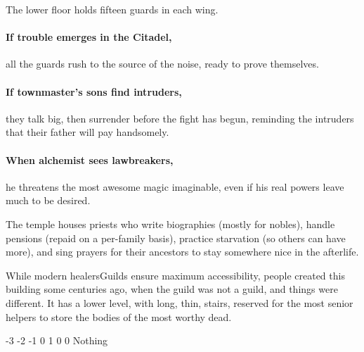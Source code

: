 \begin{multicols}{2}
The lower floor holds fifteen guards in each wing.


\paragraph{If trouble emerges in the Citadel,}
all the guards rush to the source of the noise, ready to prove themselves.


\paragraph{If \gls{townmaster}'s sons find intruders,}
they talk big, then surrender before the fight has begun, reminding the intruders that their father will pay handsomely.

\citadelAlchemist

\showStdSpells

\label{citadel_alchemist}

\paragraph{When \gls{alchemist} sees lawbreakers,}
he threatens the most awesome magic imaginable, even if his real powers leave much to be desired.

\townmaster


The temple houses priests who write biographies (mostly for nobles), handle pensions (repaid on a per-family basis), practice starvation (so others can have more), and sing prayers for their ancestors to stay somewhere nice in the afterlife.

While modern \glspl{healersGuild} ensure maximum accessibility, people created this building some centuries ago, when the guild was not a guild, and things were different.
It has a lower level, with long, thin, stairs, reserved for the most senior \glspl{helper} to store the bodies of the most worthy dead.

{-3}%
{-2}%
{{-1}%
{0}%
{1}}%
{0}%
{0}%
{}%
{Nothing}%
{
  \setcounter{Academics}{1}
  \setcounter{Empathy}{2}
  \setcounter{Medicine}{2}
  \addtocounter{fp}{5}
}


\end{multicols}
